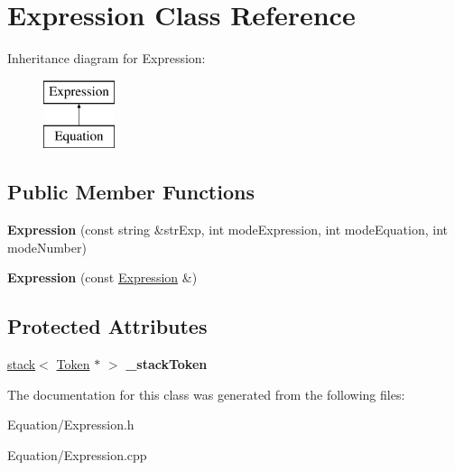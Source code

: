 \hypertarget{class_expression}{}\section{Expression Class Reference}
\label{class_expression}
Inheritance diagram for Expression\+:\begin{figure}[H]
\begin{center}
\leavevmode
\includegraphics[height=2.000000cm]{class_expression}
\end{center}
\end{figure}
\subsection*{Public Member Functions}
\begin{DoxyCompactItemize}
\item 
\hypertarget{class_expression_a66f8d26da99a31ee208cbcba6f95b71b}{}{\bfseries Expression} (const string \&str\+Exp, int mode\+Expression, int mode\+Equation, int mode\+Number)\label{class_expression_a66f8d26da99a31ee208cbcba6f95b71b}

\item 
\hypertarget{class_expression_a568506b67cd65c7f8c2885c9146c98bd}{}{\bfseries Expression} (const \hyperlink{class_expression}{Expression} \&)\label{class_expression_a568506b67cd65c7f8c2885c9146c98bd}

\end{DoxyCompactItemize}
\subsection*{Protected Attributes}
\begin{DoxyCompactItemize}
\item 
\hypertarget{class_expression_a249c583f1a0ec2aa5e703be12c2e512f}{}\hyperlink{classstack}{stack}$<$ \hyperlink{class_token}{Token} $\ast$ $>$ {\bfseries \+\_\+stack\+Token}\label{class_expression_a249c583f1a0ec2aa5e703be12c2e512f}

\end{DoxyCompactItemize}


The documentation for this class was generated from the following files\+:\begin{DoxyCompactItemize}
\item 
Equation/Expression.\+h\item 
Equation/Expression.\+cpp\end{DoxyCompactItemize}
